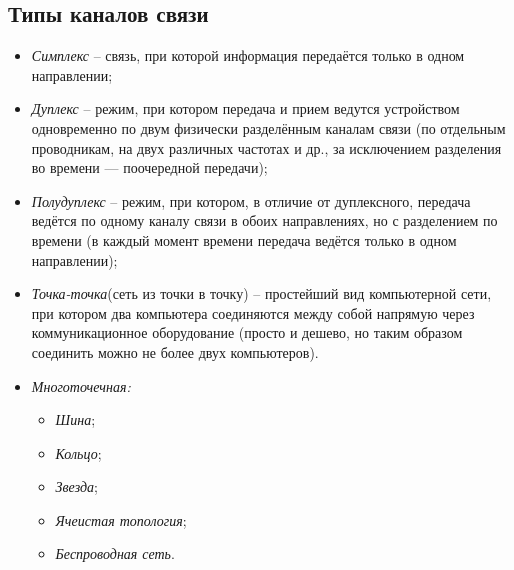 \subsection{Типы каналов связи}
\begin{itemize}
\item \emph{Симплекс} -- связь, при которой информация передаётся только в одном направлении;
\item \emph{Дуплекс} -- режим, при котором передача и прием ведутся устройством одновременно по двум физически разделённым каналам связи (по отдельным проводникам, на двух различных частотах и др., за исключением разделения во времени — поочередной передачи);
\item \emph{Полудуплекс} -- режим, при котором, в отличие от дуплексного, передача ведётся по одному каналу связи в обоих направлениях, но с разделением по времени (в каждый момент времени передача ведётся только в одном направлении);
\item \emph{Точка-точка}(сеть из точки в точку) -- простейший вид компьютерной сети, при котором два компьютера соединяются между собой напрямую через коммуникационное оборудование (просто и дешево, но таким образом соединить можно не более двух компьютеров).
\newpage
\item \emph{Многоточечная:}
\begin{itemize}
\item \emph{Шина};
\item \emph{Кольцо};
\item \emph{Звезда};
\item \emph{Ячеистая топология};
\item \emph{Беспроводная сеть}.
\end{itemize}
\end{itemize}